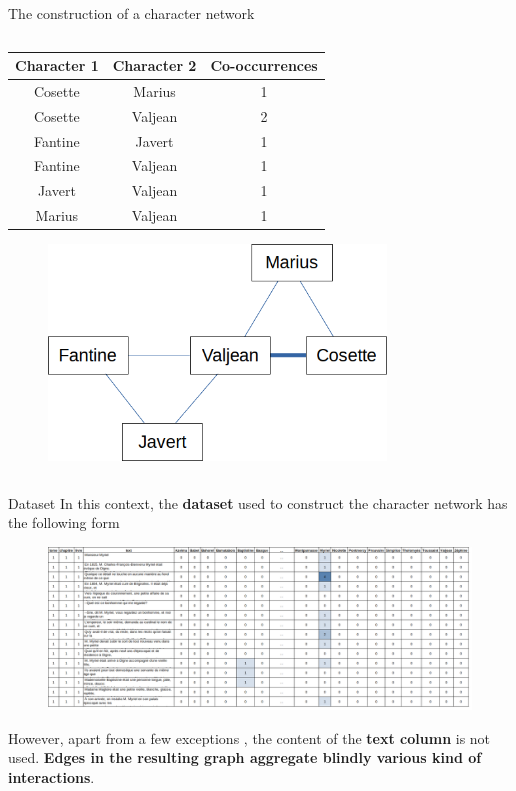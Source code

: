 \documentclass[10pt]{beamer}
\newcommand{\imp}[1]{\textbf{\color{cyan}#1}}
\begin{document}
\begin{frame}{The construction of a character network}
\begin{columns}
\begin{column}{0.5\textwidth}
				\begin{table}
					\centering
					\scriptsize
					\begin{tabular}{|c|c|c|} 
						\hline
						Character 1 & Character 2 & Co-occurrences \\ 
						\hline
						Cosette & Marius & 1 \\
						Cosette & Valjean & 2 \\ 
						Fantine & Javert & 1 \\
						Fantine & Valjean & 1 \\
						Javert & Valjean & 1 \\
						Marius & Valjean & 1 \\
						\hline
					\end{tabular}
				\end{table}
				\begin{figure}
					\centering
					\includegraphics[width=0.8\textwidth]{img/mini_graph.png}
				\end{figure}
			\end{column}
		\end{columns}
	\end{frame}
	
	
	\begin{frame}{Dataset}
		In this context, the \imp{dataset} used to construct the character network has the following form
		\begin{figure}
			\centering
			\includegraphics[width=\textwidth]{img/data_table.png}
		\end{figure}
		However, apart from a few exceptions \cite{nalisnick_character--character_2013, trovati_towards_2014, min_modeling_2019}, the content of the \imp{text column} is not used. \imp{Edges in the resulting graph aggregate blindly various kind of interactions}.
	\end{frame}
	
\end{document}
